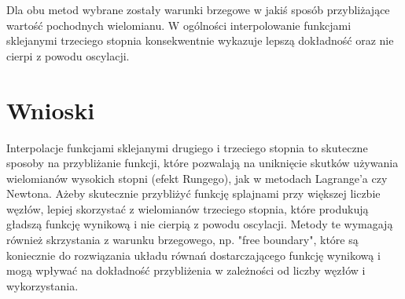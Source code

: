 \documentclass{article}
\begin{document}
Dla obu metod wybrane zostały warunki brzegowe w jakiś sposób przybliżające wartość pochodnych wielomianu.
W ogólności interpolowanie funkcjami sklejanymi trzeciego stopnia konsekwentnie wykazuje lepszą dokładność oraz 
nie cierpi z powodu oscylacji. 

\newpage
\section{Wnioski}
Interpolacje funkcjami sklejanymi drugiego i trzeciego stopnia to skuteczne sposoby na przybliżanie funkcji, które pozwalają
na uniknięcie skutków używania wielomianów wysokich stopni (efekt Rungego), jak w metodach Lagrange'a czy Newtona. Ażeby skutecznie przybliżyć
funkcję splajnami przy większej liczbie węzłów, lepiej skorzystać z wielomianów trzeciego stopnia, które produkują gładszą funkcję
wynikową i nie cierpią z powodu oscylacji. Metody te wymagają również skrzystania z warunku brzegowego, np. "free boundary", które
są koniecznie do rozwiązania układu równań dostarczającego funkcję wynikową i mogą wpływać na dokładność przybliżenia w zależności
od liczby węzłów i wykorzystania.
\end{document}
